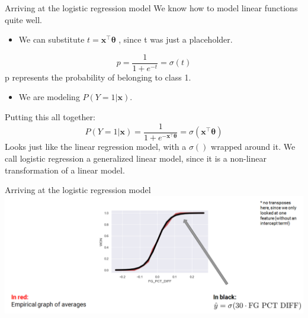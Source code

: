\documentclass[aspectratio=169]{../latex_main/tntbeamer}  %
\begin{document}
	\begin{frame}{Arriving at the logistic regression model}
	    We know how to model linear functions quite well.\\
	    \begin{itemize}
	        \item We can substitute          $t = \bm{x}^\intercal\bm{\theta} $           , since t was just a placeholder.
	    \end{itemize}
	    \begin{equation*}
	        p = \frac{1}{1 + e^{-t}} = \sigma (t)
	    \end{equation*}
	    p represents the probability of belonging to class 1.
	    \begin{itemize}
	        \item We are modeling          $P(Y=1|\bm{x})$.
	    \end{itemize}
	    Putting this all together:
	    \begin{equation*}
	        P(Y=1|\bm{x}) = \frac{1}{1 + e^{-\bm{x}^\intercal\bm{\theta}}} = \sigma(\bm{x}^\intercal\bm{\theta})
	    \end{equation*}
	    Looks just like the linear regression model, with a $\sigma()$ wrapped around it.
We call logistic regression a generalized linear model, since it is a non-linear transformation of a linear model.

	\end{frame}
	
	
	
	\begin{frame}{Arriving at the logistic regression model}
	    \includegraphics[scale=.4]{Bild6}
	\end{frame}
\end{document}
